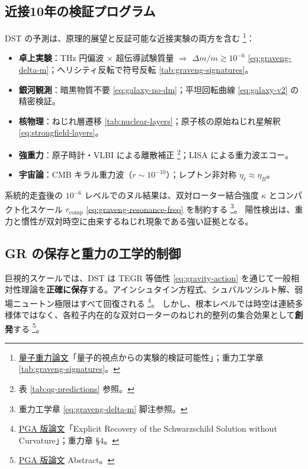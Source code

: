 \documentclass[dvipdfmx,a4paper,oneside]{jsbook}
\numberwithin{equation}{chapter}
\begin{document}
\subsection{近接10年の検証プログラム}

DST の予測は、原理的展望と反証可能な近接実験の両方を含む \footnote{\hyperref[sec:sister-manuscripts]{量子重力論文}「量子的視点からの実験的検証可能性」；重力工学章 \eqref{tab:graveng-signatures}。}：
\begin{itemize}[leftmargin=2em]
  \item \textbf{卓上実験}：THz 円偏波 × 超伝導試験質量 \(\Rightarrow\) \(\Delta m/m \gtrsim 10^{-6}\) \eqref{eq:graveng-delta-m}；ヘリシティ反転で符号反転 \eqref{tab:graveng-signatures}。
  \item \textbf{銀河観測}：暗黒物質不要 \eqref{eq:galaxy-no-dm}；平坦回転曲線 \eqref{eq:galaxy-v2} の精密検証。
  \item \textbf{核物理}：ねじれ層遷移 \eqref{tab:nuclear-layers}；原子核の原始ねじれ星解釈 \eqref{eq:strongfield-layers}。
  \item \textbf{強重力}：原子時計・VLBI による離散補正 \footnote{表 \ref{tab:qg-predictions} 参照。}；LISA による重力波エコー。
  \item \textbf{宇宙論}：CMB キラル重力波（\(r \sim 10^{-10}\)）；レプトン非対称 \(\eta_\ell \approx \eta_B\)。
\end{itemize}

系統的走査後の \(10^{-6}\) レベルでのヌル結果は、双対ローター結合強度 \(\kappa\) とコンパクト化スケール \(r_{\mathrm{comp}}\) \eqref{eq:graveng-resonance-freq} を制約する \footnote{重力工学章 \eqref{eq:graveng-delta-m} 脚注参照。}。
陽性検出は、重力と慣性が双対時空に由来するねじれ現象である強い証拠となる。

\subsection{GR の保存と重力の工学的制御}

巨視的スケールでは、DST は TEGR 等価性 \eqref{eq:gravity-action} を通じて一般相対性理論を\textbf{正確に保存}する。アインシュタイン方程式、シュバルツシルト解、弱場ニュートン極限はすべて回復される \footnote{\hyperref[sec:sister-manuscripts]{PGA 版論文}「Explicit Recovery of the Schwarzschild Solution without Curvature」；重力章 §4。}。
しかし、根本レベルでは時空は連続多様体ではなく、各粒子内在的な双対ローターのねじれ的整列の集合効果として\textbf{創発}する \footnote{\hyperref[sec:sister-manuscripts]{PGA 版論文} Abstract。}。
\end{document}
